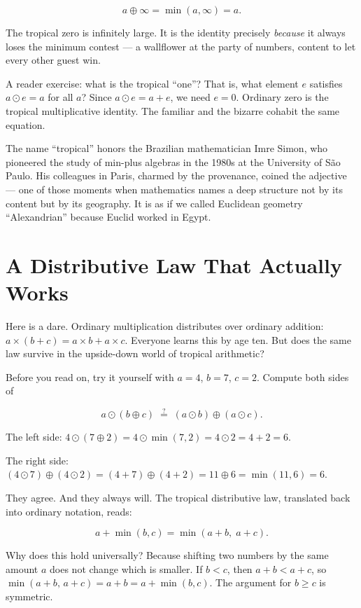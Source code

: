 \[a \oplus \infty = \min(a, \infty) = a.\]

The tropical zero is infinitely large. It is the identity precisely \emph{because} it always loses the minimum contest --- a wallflower at the party of numbers, content to let every other guest win.

A reader exercise: what is the tropical ``one''? That is, what element \(e\) satisfies \(a \odot e = a\) for all \(a\)? Since \(a \odot e = a + e\), we need \(e = 0\). Ordinary zero is the tropical multiplicative identity. The familiar and the bizarre cohabit the same equation.

The name ``tropical'' honors the Brazilian mathematician Imre Simon, who pioneered the study of min-plus algebras in the 1980s at the University of São Paulo. His colleagues in Paris, charmed by the provenance, coined the adjective --- one of those moments when mathematics names a deep structure not by its content but by its geography. It is as if we called Euclidean geometry ``Alexandrian'' because Euclid worked in Egypt.



\section{A Distributive Law That Actually Works}\label{ch15-a-distributive-law-that-actually-works}

Here is a dare. Ordinary multiplication distributes over ordinary addition: \(a \times (b + c) = a \times b + a \times c\). Everyone learns this by age ten. But does the same law survive in the upside-down world of tropical arithmetic?

Before you read on, try it yourself with \(a = 4\), \(b = 7\), \(c = 2\). Compute both sides of

\[a \odot (b \oplus c) \;\stackrel{?}{=}\; (a \odot b) \oplus (a \odot c).\]

The left side: \(4 \odot (7 \oplus 2) = 4 \odot \min(7,2) = 4 \odot 2 = 4 + 2 = 6\).

The right side: \((4 \odot 7) \oplus (4 \odot 2) = (4+7) \oplus (4+2) = 11 \oplus 6 = \min(11, 6) = 6\).

They agree. And they always will. The tropical distributive law, translated back into ordinary notation, reads:

\[a + \min(b, c) = \min(a + b,\; a + c).\]

Why does this hold universally? Because shifting two numbers by the same amount \(a\) does not change which is smaller. If \(b < c\), then \(a + b < a + c\), so \(\min(a + b,\, a + c) = a + b = a + \min(b,c)\). The argument for \(b \ge c\) is symmetric.


